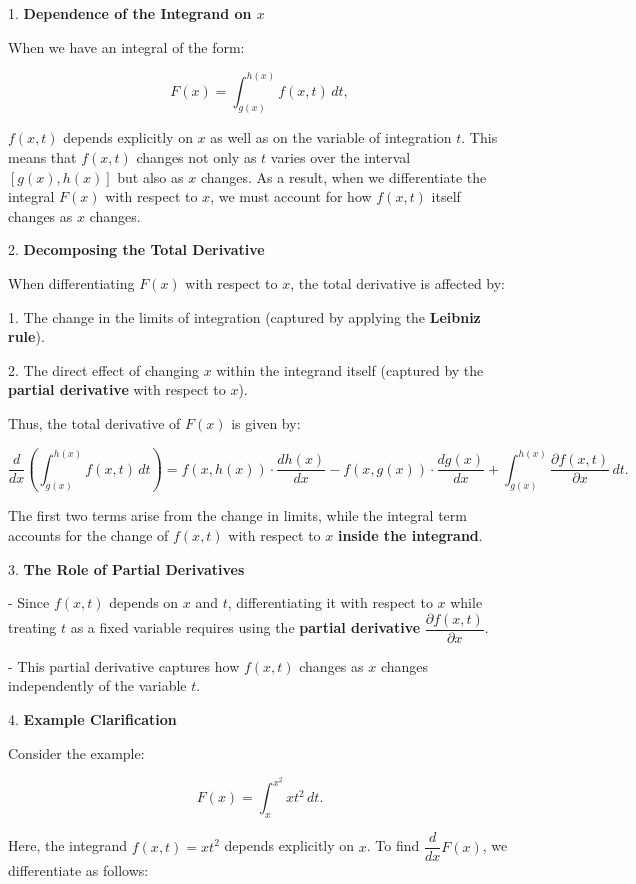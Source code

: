 \documentclass[a4paper,12pt]{book}
\begin{document}
1. \textbf{Dependence of the Integrand on \( x \)}

When we have an integral of the form:

\[
F(x) = \int_{g(x)}^{h(x)} f(x, t) \, dt,
\]

\( f(x, t) \) depends explicitly on \( x \) as well as on the variable of integration \( t \). This means that \( f(x, t) \) changes not only as \( t \) varies over the interval \([g(x), h(x)]\) but also as \( x \) changes. As a result, when we differentiate the integral \( F(x) \) with respect to \( x \), we must account for how \( f(x, t) \) itself changes as \( x \) changes.

2. \textbf{Decomposing the Total Derivative}

When differentiating \( F(x) \) with respect to \( x \), the total derivative is affected by:

1. The change in the limits of integration (captured by applying the \textbf{Leibniz rule}).

2. The direct effect of changing \( x \) within the integrand itself (captured by the \textbf{partial derivative} with respect to \( x \)).

Thus, the total derivative of \( F(x) \) is given by:

\[
\dfrac{d}{dx} \left( \int_{g(x)}^{h(x)} f(x, t) \, dt \right) = f(x, h(x)) \cdot \dfrac{dh(x)}{dx} - f(x, g(x)) \cdot \dfrac{dg(x)}{dx} + \int_{g(x)}^{h(x)} \dfrac{\partial f(x, t)}{\partial x} \, dt.
\]

The first two terms arise from the change in limits, while the integral term accounts for the change of \( f(x, t) \) with respect to \( x \) \textbf{inside the integrand}.

3. \textbf{The Role of Partial Derivatives}

- Since \( f(x, t) \) depends on \( x \) and \( t \), differentiating it with respect to \( x \) while treating \( t \) as a fixed variable requires using the \textbf{partial derivative} \(\dfrac{\partial f(x, t)}{\partial x}\).

- This partial derivative captures how \( f(x, t) \) changes as \( x \) changes independently of the variable \( t \).

4. \textbf{Example Clarification}

Consider the example:

\[
F(x) = \int_{x}^{x^2} x t^2 \, dt.
\]

Here, the integrand \( f(x, t) = xt^2 \) depends explicitly on \( x \). To find \(\dfrac{d}{dx} F(x)\), we differentiate as follows:
\end{document}
